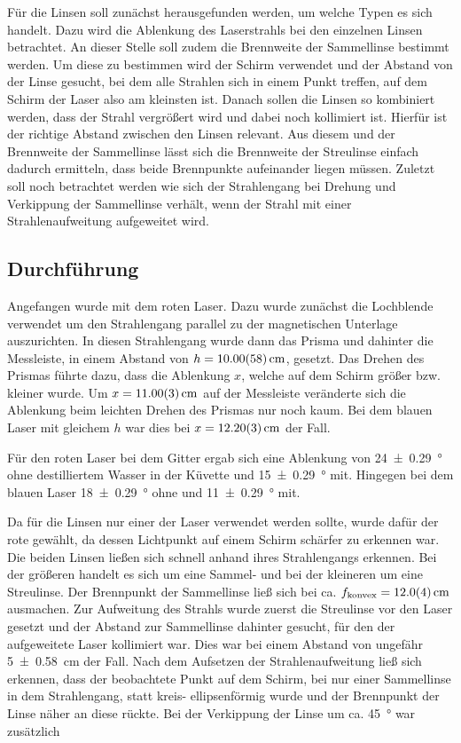 			Für die Linsen soll zunächst herausgefunden werden, um welche Typen es sich handelt.
			Dazu wird die Ablenkung des Laserstrahls bei den einzelnen Linsen betrachtet.
			An dieser Stelle soll zudem die Brennweite der Sammellinse bestimmt werden.
			Um diese zu bestimmen wird der Schirm verwendet und der Abstand von der Linse gesucht, bei dem alle Strahlen sich in einem Punkt treffen, auf dem Schirm der Laser also am kleinsten ist. 
			Danach sollen die Linsen so kombiniert werden, dass der Strahl vergrößert wird und dabei noch kollimiert ist.
			Hierfür ist der richtige Abstand zwischen den Linsen relevant.
			Aus diesem und der Brennweite der Sammellinse lässt sich die Brennweite der Streulinse einfach dadurch ermitteln, dass beide Brennpunkte aufeinander liegen müssen.  
			Zuletzt soll noch betrachtet werden wie sich der Strahlengang bei Drehung und Verkippung der Sammellinse verhält, wenn der Strahl mit einer Strahlenaufweitung aufgeweitet wird.
			
	\subsection{Durchführung}
		
		Angefangen wurde mit dem roten Laser.
		Dazu wurde zunächst die Lochblende verwendet um den Strahlengang parallel zu der magnetischen Unterlage auszurichten.
		In diesen Strahlengang wurde dann das Prisma und dahinter die Messleiste, in einem Abstand von $h = \SI{10+-0,58}{\centi\meter}$, gesetzt.
		Das Drehen des Prismas führte dazu, dass die Ablenkung $x$, welche auf dem Schirm größer bzw. kleiner wurde.
		Um $x = \SI{11,0+-0,03}{\centi\meter}$ auf der Messleiste veränderte sich die Ablenkung beim leichten Drehen des Prismas nur noch kaum.
		Bei dem blauen Laser mit gleichem $h$ war dies bei $x = \SI{12,2+-0,03}{\centi\meter}$ der Fall. 
		
		Für den roten Laser bei dem Gitter ergab sich eine Ablenkung von \SI{24+-0,29}{\degree} ohne destilliertem Wasser in der Küvette und \SI{15+-0,29}{\degree} mit.
		Hingegen bei dem blauen Laser \SI{18+-0,29}{\degree} ohne und \SI{11+-0,29}{\degree} mit.
		
		Da für die Linsen nur einer der Laser verwendet werden sollte, wurde dafür der rote gewählt, da dessen Lichtpunkt auf einem Schirm schärfer zu erkennen war.
		Die beiden Linsen ließen sich schnell anhand ihres Strahlengangs erkennen.
		Bei der größeren handelt es sich um eine Sammel- und bei der kleineren um eine Streulinse.
		Der Brennpunkt der Sammellinse ließ sich bei ca. $f_\text{konvex} = \SI{12+-0,4}{\centi\meter}$ ausmachen.
		Zur Aufweitung des Strahls wurde zuerst die Streulinse vor den Laser gesetzt und der Abstand zur Sammellinse dahinter gesucht, für den der aufgeweitete Laser kollimiert war.
		Dies war bei einem Abstand von ungefähr \SI{5+-0,58}{\centi\meter} der Fall.
		Nach dem Aufsetzen der Strahlenaufweitung ließ sich erkennen, dass der beobachtete Punkt auf dem Schirm, bei nur einer Sammellinse in dem Strahlengang, statt kreis- ellipsenförmig wurde und der Brennpunkt der Linse näher an diese rückte.
		Bei der Verkippung der Linse um ca. \SI{45}{\degree} war zusätzlich %
		
